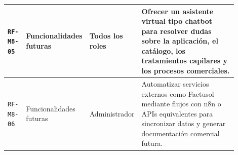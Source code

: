 {\begin{supertabular}{|>{\raggedright\arraybackslash}p{0.085\linewidth}|>{\raggedright\arraybackslash}p{0.205\linewidth}|>{\raggedright\arraybackslash}p{0.18\linewidth}|>{\raggedright\arraybackslash}p{0.43\linewidth}|}
\hline
\texttt{RF-M8-05} & Funcionalidades futuras & Todos los roles & Ofrecer un asistente virtual tipo chatbot para resolver dudas sobre la aplicación, el catálogo, los tratamientos capilares y los procesos comerciales. \\
\hline
\texttt{RF-M8-06} & Funcionalidades futuras & Administrador & Automatizar servicios externos como Factusol mediante flujos con n8n o APIs equivalentes para sincronizar datos y generar documentación comercial futura. \\
\hline
\end{supertabular}
}
